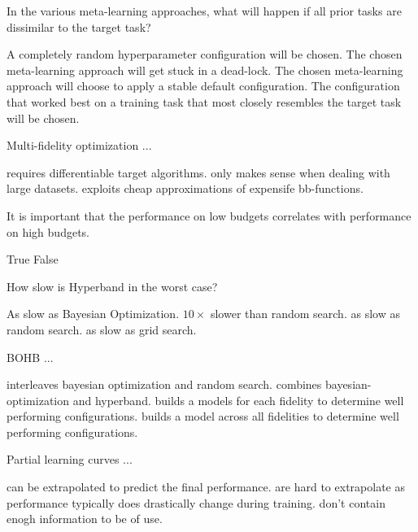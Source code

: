 \documentclass{exam}
\begin{document}
\begin{questions}
\question In the various meta-learning approaches, what will happen if all prior tasks are dissimilar to the target task?
\begin{choices}
    \choice A completely random hyperparameter configuration will be chosen.
    \choice The chosen meta-learning approach will get stuck in a dead-lock.
    \choice The chosen meta-learning approach will choose to apply a stable default configuration.
    \choice The configuration that worked best on a training task that most closely resembles the target task will be chosen. %
\end{choices}

\question Multi-fidelity optimization ...
\begin{choices}
    \choice requires differentiable target algorithms.
    \choice only makes sense when dealing with large datasets.
    \choice exploits cheap approximations of expensife bb-functions. %
\end{choices}

\question It is important that the performance on low budgets correlates with performance on high budgets.
\begin{choices}
    \choice True %
    \choice False
\end{choices}

\question How slow is Hyperband in the worst case?
\begin{choices}
    \choice As slow as Bayesian Optimization.
    \choice $10\times$ slower than random search.
    \choice as slow as random search. %
    \choice as slow as grid search.
\end{choices}

\question BOHB ...
\begin{choices}
    \choice interleaves bayesian optimization and random search.
    \choice combines bayesian-optimization and hyperband. %
    \choice builds a models for each fidelity to determine well performing configurations. %
    \choice builds a model across all fidelities to determine well performing configurations.
\end{choices}

\question Partial learning curves ...
\begin{choices}
    \choice can be extrapolated to predict the final performance. %
    \choice are hard to extrapolate as performance typically does drastically change during training. %
    \choice don't contain enogh information to be of use.
\end{choices}


\end{questions}
\end{document}
